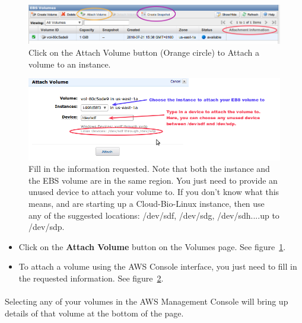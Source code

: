 \begin{figure}[!hd]
	\fbox
	{
		\begin{minipage}{13cm}
\includegraphics[width=\maxwidth]{"images/attachVolume-1"}
\caption[Attaching a volume]{\label{fig:attachvolume1}Click on the Attach Volume button (Orange circle) to Attach a volume to an instance.}
		\end{minipage}
	}	
\end{figure}


\begin{figure}[!hd]
	\fbox
	{
		\begin{minipage}{13cm}
\includegraphics[width=\maxwidth]{"images/attachVolume-2"}
\caption[Attaching a volume]{\label{fig:attachvolume2}Fill in the information requested. Note that both the instance and the EBS volume are in the same region. You just need to provide an unused device to attach your volume to. If you don't know what this means, and are starting up a Cloud-Bio-Linux instance, then use any of the suggested locations: /dev/sdf, /dev/sdg, /dev/sdh....up to /dev/sdp.}
		\end{minipage}
	}
\end{figure}


\begin{itemize}
\item Click on the \textbf{Attach Volume} button on the Volumes page. See figure~\ref{fig:attachvolume1}. 
\item To attach a volume using the AWS Console interface, you just need to fill in the requested information. See figure~\ref{fig:attachvolume2}.
\end{itemize}
\paragraph{}Selecting any of your volumes in the AWS Management Console will bring up details of that volume at the bottom of the page. 



